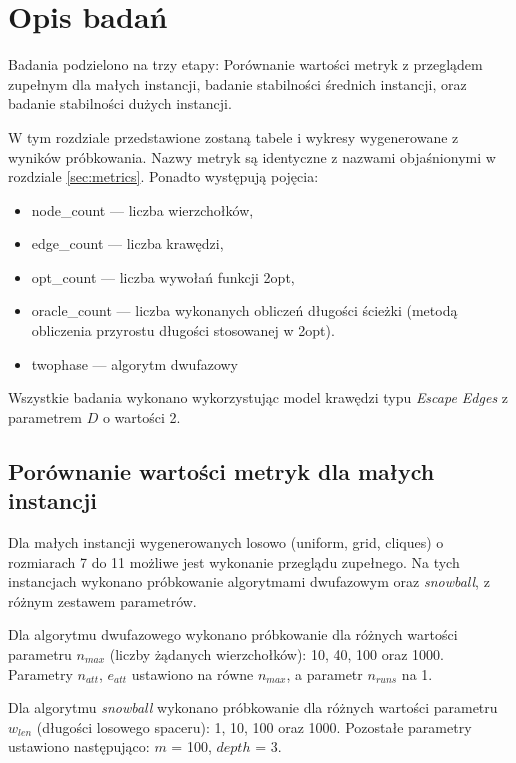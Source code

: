 \section{Opis badań}

Badania podzielono na trzy etapy: Porównanie wartości metryk z przeglądem zupełnym dla małych instancji,
badanie stabilności średnich instancji, oraz badanie stabilności dużych instancji.

W tym rozdziale przedstawione zostaną tabele i wykresy wygenerowane z wyników próbkowania.
Nazwy metryk są identyczne z nazwami objaśnionymi w rozdziale \ref{sec:metrics}.
Ponadto występują pojęcia:

\begin{itemize}
    \item node\_count --- liczba wierzchołków,
    \item edge\_count --- liczba krawędzi,
    \item opt\_count --- liczba wywołań funkcji 2opt,
    \item oracle\_count --- liczba wykonanych obliczeń długości ścieżki (metodą obliczenia przyrostu długości stosowanej w 2opt).
    \item twophase --- algorytm dwufazowy
\end{itemize}

Wszystkie badania wykonano wykorzystując model krawędzi typu \textit{Escape Edges} z parametrem $D$ o wartości 2.

\subsection{Porównanie wartości metryk dla małych instancji}
Dla małych instancji wygenerowanych losowo (uniform, grid, cliques) o rozmiarach 7 do 11
możliwe jest wykonanie przeglądu zupełnego.
Na tych instancjach wykonano próbkowanie algorytmami dwufazowym oraz \textit{snowball}, z różnym zestawem parametrów.

Dla algorytmu dwufazowego wykonano próbkowanie dla różnych wartości parametru $n_{max}$ (liczby żądanych wierzchołków): 10, 40, 100 oraz 1000.
Parametry $n_{att}$, $e_{att}$ ustawiono na równe $n_{max}$, a parametr $n_{runs}$ na 1.

Dla algorytmu \textit{snowball} wykonano próbkowanie dla różnych wartości parametru $w_{len}$ (długości losowego spaceru): 1, 10, 100 oraz 1000.
Pozostałe parametry ustawiono następująco: $m$ = 100, $depth$ = 3.

